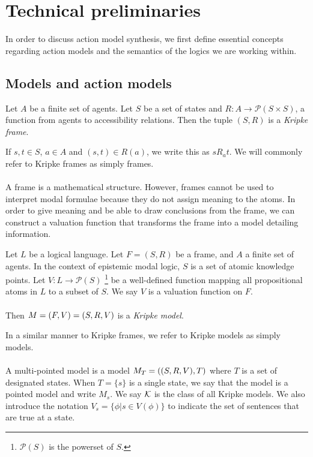\chapter{Technical preliminaries} \label{chapter:prelim}
In order to discuss action model synthesis, we first define essential concepts
regarding action
models and the semantics of the logics we are working within.

\section{Models and action models} \label{subsec:prelim:models}

\begin{defn} \label{frame}
	Let $A$ be a finite set of agents.
	Let $S$ be a set of states and $R: A \to \mathcal{P}(S \times S)$, a function from agents to
	accessibility relations.
	Then the tuple $(S, R)$ is a {\em Kripke frame}.
\end{defn}

If $s, t \in S$, $a \in A$ and $(s,t) \in R(a)$, we write this as $s R_a t$.
We will commonly refer to Kripke frames as simply frames.\\
\\
A frame is a mathematical structure.
However, frames cannot be used to interpret modal formulae because they do not assign meaning to the
atoms.
In order to give meaning and be able to draw conclusions from the frame, we can
construct a valuation function that transforms the frame into a model detailing
information.

\begin{defn} \label{model}
	Let $L$ be a logical language.
	Let $F = (S, R)$ be a frame, and $A$ a finite set of agents.
	In the context of epistemic modal logic, $S$ is a set of atomic knowledge points.
	Let $V: L \to \mathcal{P}(S)$ \footnote{$\mathcal{P}(S)$ is the powerset of $S$.} be a
	well-defined function mapping all propositional atoms in $L$ to a subset of $S$.
	We say $V$ is a valuation function on $F$.\\
	\\
	Then $M = (F, V) = (S, R, V)$ is a {\em Kripke model}.
\end{defn}

In a similar manner to Kripke frames, we refer to Kripke models as simply models.\\
\\
A multi-pointed model is a model $M_T = ((S, R, V), T)$ where $T$ is a set of designated states.
When $T = \{s\}$ is a single state, we say that the model is a pointed model and write $M_s$.
We say $\mathcal{K}$ is the class of all Kripke models.
We also introduce the notation $V_s = \{ \phi | s \in V(\phi)\}$ to indicate the set of sentences
that are true at a state.

